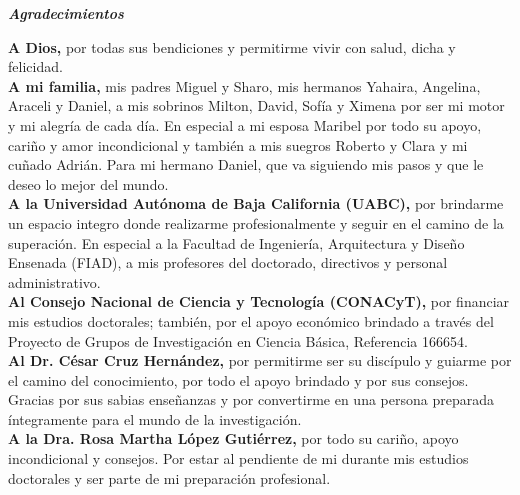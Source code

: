 
\newpage


\LARGE{
\begin{center}
\textit{\textbf{Agradecimientos}}
\end{center}}

\vspace{0.5cm}

\normalsize{
\textbf{A Dios,} por todas sus bendiciones y permitirme vivir con salud, dicha y felicidad. \\

\textbf{A mi familia,} mis padres Miguel y Sharo, mis hermanos Yahaira, Angelina, Araceli y Daniel, a mis sobrinos Milton, David, Sofía y Ximena por ser mi motor y mi alegría de cada día. En especial a mi esposa Maribel por todo su apoyo, cariño y amor incondicional y también a mis suegros Roberto y Clara y mi cuñado Adrián. Para mi hermano Daniel, que va siguiendo mis pasos y que le deseo lo mejor del mundo. \\

\textbf{A la Universidad Autónoma de Baja California (UABC),} por brindarme un espacio integro donde realizarme profesionalmente y seguir en el camino de la superación. En especial a la Facultad de Ingeniería, Arquitectura y Diseño Ensenada (FIAD), a mis profesores del doctorado, directivos y personal administrativo.
\\ 

\textbf{Al Consejo Nacional de Ciencia y Tecnología (CONACyT),} por financiar mis estudios doctorales; también, por el apoyo económico brindado a través del Proyecto de Grupos de Investigación en Ciencia Básica, Referencia 166654. \\

\textbf{Al Dr. César Cruz Hernández,} por permitirme ser su discípulo y guiarme por el camino del conocimiento, por todo el apoyo brindado y por sus consejos. Gracias por sus sabias enseñanzas y por convertirme en una persona preparada íntegramente para el mundo de la investigación.  \\

\textbf{A la Dra. Rosa Martha López Gutiérrez,} por todo su cariño, apoyo incondicional y consejos. Por estar al pendiente de mi durante mis estudios doctorales y ser parte de mi preparación profesional.  \\

}
